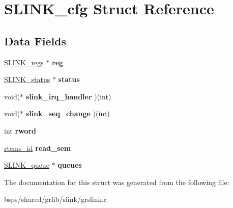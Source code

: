 \hypertarget{structSLINK__cfg}{}\section{S\+L\+I\+N\+K\+\_\+cfg Struct Reference}
\label{structSLINK__cfg}
\subsection*{Data Fields}
\begin{DoxyCompactItemize}
\item 
\mbox{\label{structSLINK__cfg_a33c2542315ecde5e7b3c12bf3c80d520}} 
\mbox{\hyperlink{structSLINK__regs}{S\+L\+I\+N\+K\+\_\+regs}} $\ast$ {\bfseries reg}
\item 
\mbox{\label{structSLINK__cfg_a49784f33fde1a87c4e80009d7a9cd7df}} 
\mbox{\hyperlink{structSLINK__status}{S\+L\+I\+N\+K\+\_\+status}} $\ast$ {\bfseries status}
\item 
\mbox{\label{structSLINK__cfg_a33b7e854622ba5362fa17e2721343f11}} 
void($\ast$ {\bfseries slink\+\_\+irq\+\_\+handler} )(int)
\item 
\mbox{\label{structSLINK__cfg_a28c0830a9dcd7f2622e26987501e53e4}} 
void($\ast$ {\bfseries slink\+\_\+seq\+\_\+change} )(int)
\item 
\mbox{\label{structSLINK__cfg_a44dcabf6624a4df8deeb5287a7cb5ee5}} 
int {\bfseries rword}
\item 
\mbox{\label{structSLINK__cfg_a1a652ce68fd3fb7e03d07d39a5f6b641}} 
\mbox{\hyperlink{group__ClassicTasks_gab20892b814dced7dd4e5b9bf42becd57}{rtems\+\_\+id}} {\bfseries read\+\_\+sem}
\item 
\mbox{\label{structSLINK__cfg_a26cc4e68567fea311e37a62a756302b0}} 
\mbox{\hyperlink{structSLINK__queue}{S\+L\+I\+N\+K\+\_\+queue}} $\ast$ {\bfseries queues}
\end{DoxyCompactItemize}


The documentation for this struct was generated from the following file\+:\begin{DoxyCompactItemize}
\item 
bsps/shared/grlib/slink/grslink.\+c\end{DoxyCompactItemize}
